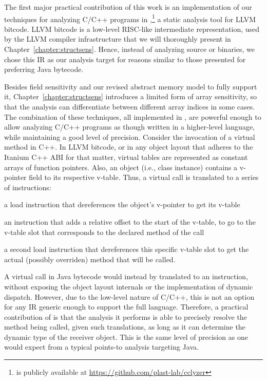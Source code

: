 The first major practical contribution of this work is an
implementation of our techniques for analyzing C/C++ programs in
\cclyzer{},\footnote{\cclyzer{} is publicly available at
  \url{https://github.com/plast-lab/cclyzer}} a static analysis tool
for LLVM bitcode. LLVM bitcode is a low-level RISC-like intermediate
representation, used by the LLVM compiler infrastructure
\cite{cgo/LattnerA04} that we will thoroughly present in
Chapter~\ref{chapter:structsens}. Hence, instead of analyzing source
or binaries, we chose this IR as our analysis target for reasons
similar to those presented for preferring Java bytecode.

Besides field sensitivity and our revised abstract memory model to
fully support it, Chapter~\ref{chapter:structsens} introduces a
limited form of array sensitivity, so that the analysis can
differentiate between different array indices in some cases. The
combination of these techniques, all implemented in \cclyzer{}, are
powerful enough to allow analyzing C/C++ programs as though written in
a higher-level language, while maintaining a good level of
precision. Consider the invocation of a virtual method in C++. In LLVM
bitcode, or in any object layout that adheres to the Itanium C++ ABI
\cite{itanium:cxx_abi} for that matter, virtual tables are represented
as constant arrays of function pointers. Also, an object (i.e., class
instance) contains a v-pointer field to its respective v-table. Thus,
a virtual call is translated to a series of instructions:
\begin{compactitem}[\(\cdot\)]
\item a load instruction that dereferences the object's v-pointer to
  get its v-table
\item an instruction that adds a relative offset to the start of the
  v-table, to go to the v-table slot that corresponds to the declared
  method of the call
\item a second load instruction that dereferences this specific
  v-table slot to get the actual (possibly overriden) method that will
  be called.
\end{compactitem}

A virtual call in Java bytecode would instead by translated to an
 instruction, without exposing the object layout
internals or the implementation of dynamic dispatch. However, due to
the low-level nature of C/C++, this is not an option for any IR
generic enough to support the full language. Therefore, a practical
contribution of \cclyzer{} is that the analysis it performs is able to
precisely resolve the method being called, given such translations, as
long as it can determine the dynamic type of the receiver object. This
is the same level of precision as one would expect from a typical
points-to analysis targeting Java.

